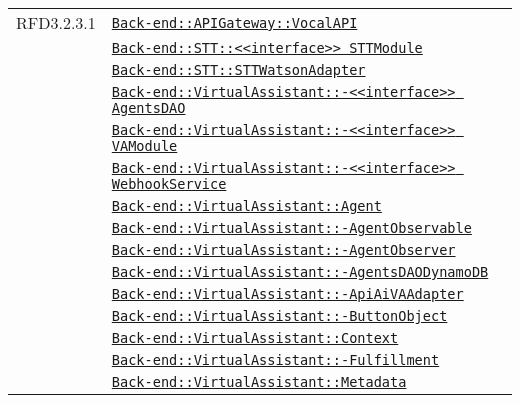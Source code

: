\begin{longtable}{|>{\centering}m{3cm}|m{10cm}<{\centering}|}
RFD3.2.3.1 & \hyperref[Back-end::APIGateway::VocalAPI]{\texttt{Back-end::APIGateway::VocalAPI}}\\
& \hyperref[Back-end::STT::<<interface>> STTModule]{\texttt{Back-end::STT::<<interface>> STTModule}}\\
& \hyperref[Back-end::STT::STTWatsonAdapter]{\texttt{Back-end::STT::STTWatsonAdapter}}\\
& \hyperref[Back-end::VirtualAssistant::<<interface>> AgentsDAO]{\texttt{Back-end::VirtualAssistant::-\linebreak <<interface>> AgentsDAO}}\\
& \hyperref[Back-end::VirtualAssistant::<<interface>> VAModule]{\texttt{Back-end::VirtualAssistant::-\linebreak <<interface>> VAModule}}\\
& \hyperref[Back-end::VirtualAssistant::<<interface>> WebhookService]{\texttt{Back-end::VirtualAssistant::-\linebreak <<interface>> WebhookService}}\\
& \hyperref[Back-end::VirtualAssistant::Agent]{\texttt{Back-end::VirtualAssistant::Agent}}\\
& \hyperref[Back-end::VirtualAssistant::AgentObservable]{\texttt{Back-end::VirtualAssistant::-\linebreak AgentObservable}}\\
& \hyperref[Back-end::VirtualAssistant::AgentObserver]{\texttt{Back-end::VirtualAssistant::-\linebreak AgentObserver}}\\
& \hyperref[Back-end::VirtualAssistant::AgentsDAODynamoDB]{\texttt{Back-end::VirtualAssistant::-\linebreak AgentsDAODynamoDB}}\\
& \hyperref[Back-end::VirtualAssistant::ApiAiVAAdapter]{\texttt{Back-end::VirtualAssistant::-\linebreak ApiAiVAAdapter}}\\
& \hyperref[Back-end::VirtualAssistant::ButtonObject]{\texttt{Back-end::VirtualAssistant::-\linebreak ButtonObject}}\\
& \hyperref[Back-end::VirtualAssistant::Context]{\texttt{Back-end::VirtualAssistant::Context}}\\
& \hyperref[Back-end::VirtualAssistant::Fulfillment]{\texttt{Back-end::VirtualAssistant::-\linebreak Fulfillment}}\\
& \hyperref[Back-end::VirtualAssistant::Metadata]{\texttt{Back-end::VirtualAssistant::Metadata}}\\

\end{longtable}
